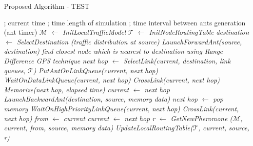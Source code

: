 \singlespace
{
\begin{algorithm}[h!]

 \caption{Proposed Algorithm - TEST}
 \label{test}

\begin{algorithmic}[1]

; current time
; time length of simulation 
; time interval between ants generation (ant timer)
            \STATE\it $\mathcal{M}$ $\leftarrow$ InitLocalTrafficModel
            \STATE \it $\mathcal{T}$ $\leftarrow$ InitNodeRoutingTable
            		\STATE destination $\leftarrow$ SelectDestination (traffic distribution at source)
            		\STATE LaunchForwardAnt(source, destination)
            \ENDIF
            		\STATE find closest node which is nearest to destination using Range Difference GPS technique
            	\ELSE
            	\STATE next hop $\leftarrow$ SelectLink(current, destination, link queues, $\mathcal{T}$)
            	\STATE PutAntOnLinkQueue(current, next hop)
            	\STATE WaitOnDataLinkQueue(current, next hop)
            	\STATE CrossLink(current, next hop)
            	\STATE Memorize(next hop, elapsed time)
            	\STATE current $\leftarrow$ next hop
            	\ENDIF
            	\ENDWHILE
            	\STATE LaunchBackwardAnt(destination, source, memory data)
            	\ENDFOR
            \STATE next hop $\leftarrow$ pop memory
            \STATE WaitOnHighPriorityLinkQueue(current, next hop)
            \STATE CrossLink(current, next hop)
            \STATE from $\leftarrow$ current
            \STATE current $\leftarrow$ next hop
            \STATE 
            \STATE r $\leftarrow$ GetNewPheromone ($\mathcal {M}$, current, from, source, memory data)
            \STATE UpdateLocalRoutingTable($\mathcal {T}$, current, source, r)
            \ENDWHILE
            \ENDFOR
            \ENDWHILE 
          \ENDFOR
 \end{algorithmic}
\end{algorithm}
}